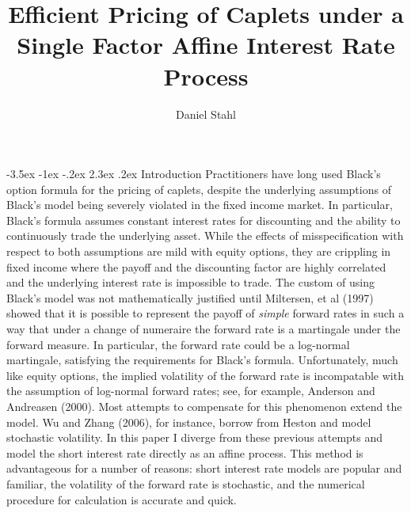 \documentclass[12pt]{article}
\author{Daniel Stahl}
\title{Efficient Pricing of Caplets under a Single Factor Affine Interest Rate Process}
\makeatletter
\renewcommand\section{\@startsection{section}{1}{\z@}%
                                  {-3.5ex \@plus -1ex \@minus -.2ex}%
                                  {2.3ex \@plus.2ex}%
                                  {\normalfont\large\bfseries}}
\theoremstyle{definition}
\theoremstyle{remark}
\makeatother
\begin{document}

\setlength{\parindent}{0pt}













\maketitle
{}
\section{Introduction}
Practitioners have long used Black's option formula for the pricing of caplets, despite the underlying assumptions of Black's model being severely violated in the fixed income market.  In particular, Black's formula assumes constant interest rates for discounting and the ability to continuously trade the underlying asset.  While the effects of misspecification with respect to both assumptions are mild with equity options, they are crippling in fixed income where the payoff and the discounting factor are highly correlated and the underlying interest rate is impossible to trade.   The custom of using Black's model was not mathematically justified until Miltersen, et al (1997) showed that it is possible to represent the payoff of \emph{simple} forward rates in such a way that under a change of numeraire the forward rate is a martingale under the forward measure.  In particular, the forward rate could be a log-normal martingale, satisfying the requirements for Black's formula.  Unfortunately, much like equity options, the implied volatility of the forward rate is incompatable with the assumption of log-normal forward rates; see, for example, Anderson and Andreasen (2000).  Most attempts to compensate for this phenomenon extend the model.  Wu and Zhang (2006), for instance, borrow from Heston and model stochastic volatility.  In this paper I diverge from these previous attempts and model the short interest rate directly as an affine process.  This method is advantageous for a number of reasons: short interest rate models are popular and familiar, the volatility of the forward rate is stochastic, and the numerical procedure for calculation is accurate and quick.  
\end{document}
